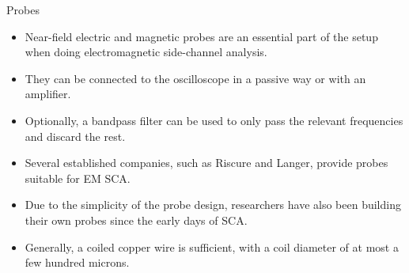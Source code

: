\begin{frame}{Probes}
    \begin{itemize}
        \item Near-field electric and magnetic probes are an essential part of the setup when doing electromagnetic side-channel analysis.
        \item They can be connected to the oscilloscope in a passive way or with an amplifier.
        \item Optionally, a bandpass filter can be used to only pass the relevant frequencies and discard the rest.
        \item Several established companies, such as Riscure and Langer, provide probes suitable for EM SCA.
        \item Due to the simplicity of the probe design, researchers have also been building their own probes since the early days of SCA.
        \item Generally, a coiled copper wire is sufficient, with a coil diameter of at most a few hundred microns.
    \end{itemize}
\end{frame}